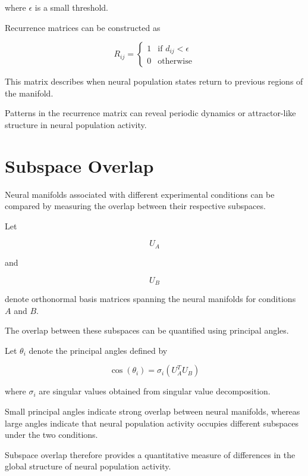 \documentclass[11pt]{report}
\begin{document}
where $\epsilon$ is a small threshold.

Recurrence matrices can be constructed as

\begin{equation}
R_{ij} =
\begin{cases}
1 & \text{if } d_{ij} < \epsilon \\
0 & \text{otherwise}
\end{cases}
\end{equation}

This matrix describes when neural population states return to
previous regions of the manifold.

Patterns in the recurrence matrix can reveal periodic dynamics
or attractor-like structure in neural population activity.

\section{Subspace Overlap}

Neural manifolds associated with different experimental conditions
can be compared by measuring the overlap between their respective
subspaces.

Let

\begin{equation}
U_A
\end{equation}

and

\begin{equation}
U_B
\end{equation}

denote orthonormal basis matrices spanning the neural manifolds
for conditions $A$ and $B$.

The overlap between these subspaces can be quantified using
principal angles.

Let $\theta_i$ denote the principal angles defined by

\begin{equation}
\cos(\theta_i) =
\sigma_i(U_A^T U_B)
\end{equation}

where $\sigma_i$ are singular values obtained from singular value
decomposition.

Small principal angles indicate strong overlap between neural
manifolds, whereas large angles indicate that neural population
activity occupies different subspaces under the two conditions.

Subspace overlap therefore provides a quantitative measure of
differences in the global structure of neural population activity.
\end{document}
